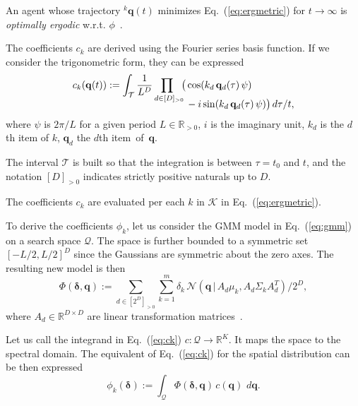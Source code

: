 \documentclass[letterpaper,10pt,conference,twoside]{IEEEtran}
\theoremstyle{definition}
\begin{document}
An agent whose trajectory ${}^k\mathbf{q}(t)$ minimizes Eq.~(\ref{eq:ergmetric}) for $t\rightarrow\infty$ is \textit{optimally ergodic} w.r.t. $\phi$~\cite{abraham2018decentralized}.

The coefficients $c_k$ are derived using the Fourier series basis function. If we consider the trigonometric form, they can be expressed
\begin{equation}\label{eq:ck}
  \begin{split}
    c_k(\mathbf{q}(t)):=\int_{\mathcal{T}}\frac{1}{L^D}\prod_{d\in[D]_{>0}\hspace*{-1ex}}\big(& \cos(k_d\,\mathbf{q}_d(\tau)\,\psi)\\[-2ex]
    &\vspace*{-4ex}-i\sin(k_d\,\mathbf{q}_d(\tau)\,\psi) \big)\,d\tau/t,
  \end{split}
\end{equation}
where $\psi$ is $2\pi/L$ for a given period $L\in\mathbb{R}_{>0}$, $i$ is the imaginary unit, $k_d$ is the $d$th item of $k$, $\mathbf{q}_d$ the $d$th item~of~$\mathbf{q}$.

The interval $\mathcal{T}$ is built so that the integration is between $\tau=t_0$ and $t$, and the notation $[D]_{>0}$ indicates strictly positive naturals up to $D$.

The coefficients $c_k$ are evaluated per each $k$ in $\mathcal{K}$ in Eq.~(\ref{eq:ergmetric}).

To derive the coefficients $\phi_k$, let us consider the GMM model in Eq.~(\ref{eq:gmm}) on a search space $\mathcal{Q}$. The space is further bounded to a symmetric set $[-L/2,L/2]^D$ since the Gaussians are symmetric about the zero axes. The resulting new model is then
\begin{equation}
  \Phi(\boldsymbol{\delta},\mathbf{q}):=\sum_{d\in[2^D]_{>0}}\sum_{k=1}^{m}\delta_k\,\mathcal{N}(\mathbf{q}\,|\,A_d\mu_k,A_d\Sigma_k A_d^T)/2^D,
\end{equation}
where $A_d\in\mathbb{R}^{D\times D}$ are linear transformation matrices~\cite{calinon2020mixture}. 

Let us call the integrand in Eq.~(\ref{eq:ck}) $c:\mathcal{Q}\longrightarrow \mathbb{R}^K$. It maps the space to the spectral domain. The equivalent of Eq.~(\ref{eq:ck}) for the spatial distribution can be then expressed
\begin{equation}\label{eq:phik}
  \phi_k(\boldsymbol{\delta}):=\int_{\mathcal{Q}} \Phi(\boldsymbol{\delta},\mathbf{q})\,c(\mathbf{q})\,\,d\mathbf{q}.
\end{equation}
\end{document}
